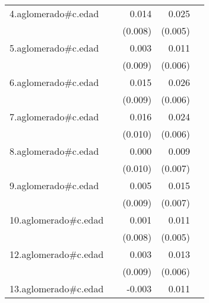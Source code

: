 {\begin{longtable}{l*{4}{D{.}{.}{-1}}}
\addlinespace
4.aglomerado#c.edad&                     &       0.014         &       0.025\sym{***}&                     \\
            &                     &     (0.008)         &     (0.005)         &                     \\
\addlinespace
5.aglomerado#c.edad&                     &       0.003         &       0.011\sym{*}  &                     \\
            &                     &     (0.009)         &     (0.006)         &                     \\
\addlinespace
6.aglomerado#c.edad&                     &       0.015         &       0.026\sym{***}&                     \\
            &                     &     (0.009)         &     (0.006)         &                     \\
\addlinespace
7.aglomerado#c.edad&                     &       0.016         &       0.024\sym{***}&                     \\
            &                     &     (0.010)         &     (0.006)         &                     \\
\addlinespace
8.aglomerado#c.edad&                     &       0.000         &       0.009         &                     \\
            &                     &     (0.010)         &     (0.007)         &                     \\
\addlinespace
9.aglomerado#c.edad&                     &       0.005         &       0.015\sym{*}  &                     \\
            &                     &     (0.009)         &     (0.007)         &                     \\
\addlinespace
10.aglomerado#c.edad&                     &       0.001         &       0.011         &                     \\
            &                     &     (0.008)         &     (0.005)         &                     \\
\addlinespace
12.aglomerado#c.edad&                     &       0.003         &       0.013\sym{*}  &                     \\
            &                     &     (0.009)         &     (0.006)         &                     \\
\addlinespace
13.aglomerado#c.edad&                     &      -0.003         &       0.011\sym{**} &                     \\

\end{longtable}}
